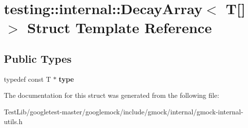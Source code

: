 \hypertarget{structtesting_1_1internal_1_1DecayArray_3_01T[]_4}{}\section{testing\+:\+:internal\+:\+:Decay\+Array$<$ T\mbox{[}\mbox{]}$>$ Struct Template Reference}
\label{structtesting_1_1internal_1_1DecayArray_3_01T[]_4}
\subsection*{Public Types}
\begin{DoxyCompactItemize}
\item 
\mbox{\label{structtesting_1_1internal_1_1DecayArray_3_01T[]_4_a1820b673d104b3a985faaef8db5d77d2}} 
typedef const T $\ast$ {\bfseries type}
\end{DoxyCompactItemize}


The documentation for this struct was generated from the following file\+:\begin{DoxyCompactItemize}
\item 
Test\+Lib/googletest-\/master/googlemock/include/gmock/internal/gmock-\/internal-\/utils.\+h\end{DoxyCompactItemize}
